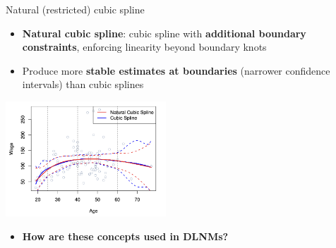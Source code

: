 \documentclass[english]{beamer}
\newcommand{\alertblue}[1]{{\color{blue}#1}}
\begin{document}
\begin{frame}{Natural (restricted) cubic spline}
    \begin{itemize}
        \item \alertblue{\textbf{Natural cubic spline}}: cubic spline with \alertblue{\textbf{additional boundary constraints}}, enforcing linearity beyond boundary knots
        \item Produce more \alertblue{\textbf{stable estimates at boundaries}} (narrower confidence intervals) than cubic splines
    \end{itemize}
    \centering
        \includegraphics[width=6cm]{images/cubic_vs_natural.png}
    \begin{itemize}
        \item \alertblue{\textbf{How are these concepts used in DLNMs?}}
    \end{itemize}
\end{frame}
\end{document}
